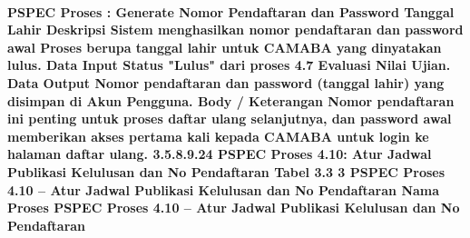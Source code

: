 \paragraph{PSPEC Proses : Generate Nomor Pendaftaran dan Password Tanggal Lahir Deskripsi Sistem menghasilkan nomor pendaftaran dan password awal Proses berupa tanggal lahir untuk CAMABA yang dinyatakan lulus. Data Input Status "Lulus" dari proses 4.7 Evaluasi Nilai Ujian. Data Output Nomor pendaftaran dan password (tanggal lahir) yang disimpan di Akun Pengguna. Body / Keterangan Nomor pendaftaran ini penting untuk proses daftar ulang selanjutnya, dan password awal memberikan akses pertama kali kepada CAMABA untuk login ke halaman daftar ulang. 3.5.8.9.24 PSPEC Proses 4.10: Atur Jadwal Publikasi Kelulusan dan No Pendaftaran Tabel 3.3 3 PSPEC Proses 4.10 – Atur Jadwal Publikasi Kelulusan dan No Pendaftaran Nama Proses PSPEC Proses 4.10 – Atur Jadwal Publikasi Kelulusan dan No Pendaftaran}~\\
